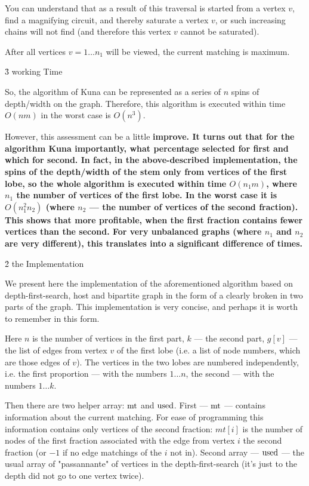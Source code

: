 You can understand that as a result of this traversal is started from a vertex $v$, find a magnifying circuit, and thereby saturate a vertex $v$, or such increasing chains will not find (and therefore this vertex $v$ cannot be saturated).

After all vertices $v = 1 \ldots n_1$ will be viewed, the current matching is maximum.


\h3{ working Time }

So, the algorithm of Kuna can be represented as a series of $n$ spins of depth/width on the graph. Therefore, this algorithm is executed within time $O (n m)$ in the worst case is $O (n^3)$.

However, this assessment can be a little \bf{improve}. It turns out that for the algorithm Kuna importantly, what percentage selected for first and which for second. In fact, in the above-described implementation, the spins of the depth/width of the stem only from vertices of the first lobe, so the whole algorithm is executed within time $O (n_1 m)$, where $n_1$ the number of vertices of the first lobe. In the worst case it is $O (n_1^2 n_2)$ (where $n_2$ --- the number of vertices of the second fraction). This shows that more profitable, when the first fraction contains fewer vertices than the second. For very unbalanced graphs (where $n_1$ and $n_2$ are very different), this translates into a significant difference of times.


\h2{ the Implementation }

We present here the implementation of the aforementioned algorithm based on depth-first-search, host and bipartite graph in the form of a clearly broken in two parts of the graph. This implementation is very concise, and perhaps it is worth to remember in this form.

Here $n$ is the number of vertices in the first part, $k$ --- the second part, $g[v]$ --- the list of edges from vertex $v$ of the first lobe (i.e. a list of node numbers, which are those edges of $v$). The vertices in the two lobes are numbered independently, i.e. the first proportion --- with the numbers $1 \ldots n$, the second --- with the numbers $1 \ldots k$.

Then there are two helper array: $\rm mt$ and $\rm used$. First --- $\rm mt$ --- contains information about the current matching. For ease of programming this information contains only vertices of the second fraction: $mt[i]$ is the number of nodes of the first fraction associated with the edge from vertex $i$ the second fraction (or $-1$ if no edge matchings of the $i$ not in). Second array --- $\rm used$ --- the usual array of "passannante" of vertices in the depth-first-search (it's just to the depth did not go to one vertex twice).

